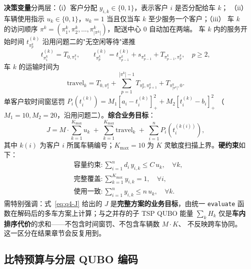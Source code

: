 \documentclass[UTF8,12pt,a4paper]{ctexart}
\begin{document}
\textbf{决策变量}分两层：（i）客户分配 $y_{i,k}\in\{0,1\}$，表示客户 $i$ 是否分配给车 $k$；
（ii）车辆使用指示 $u_k\in\{0,1\}$，$u_k=1$ 当且仅当车 $k$ 至少服务一个客户；（iii）
车 $k$ 的访问顺序 $\pi^k=(\pi_1^k,\pi_2^k,\dots,\pi_{|\pi^k|}^k)$，配送中心 $0$ 自动加在两端。
车 $k$ 内的服务开始时间 $t_{\pi_p^k}^{(k)}$ 沿用问题二的"无空闲等待"递推
\begin{equation}
\label{eq:q4-time}
t_{\pi_1^k}^{(k)}=T_{0,\pi_1^k},\qquad
t_{\pi_p^k}^{(k)}=t_{\pi_{p-1}^k}^{(k)}+s_{\pi_{p-1}^k}+T_{\pi_{p-1}^k,\pi_p^k},\quad p\ge 2,
\end{equation}
车 $k$ 的运输时间为
\begin{equation}
\label{eq:q4-travel}
\mathrm{travel}_k=T_{0,\pi_1^k}+\sum_{p=1}^{|\pi^k|-1}T_{\pi_p^k,\pi_{p+1}^k}+T_{\pi_{|\pi^k|}^k,0}.
\end{equation}
单客户软时间窗惩罚 $P_i(t_i^{(k)})=M_1[a_i-t_i^{(k)}]_+^2+M_2[t_i^{(k)}-b_i]_+^2$
（$M_1=10,M_2=20$，沿用问题二）。\textbf{综合业务目标}：
\begin{equation}
\label{eq:q4-J}
J=M\!\cdot\!\sum_{k=1}^{K_{\max}}u_k\;+\;\sum_{k=1}^{K_{\max}}\mathrm{travel}_k\;+\;\sum_{i=1}^{n}P_i(t_i^{(k(i))}),
\end{equation}
其中 $k(i)$ 为客户 $i$ 所属车辆编号；$K_{\max}=10$ 为 $K$ 灵敏度扫描上界。\textbf{硬约束}如下：
\begin{align}
\label{eq:q4-cap}
&\textbf{容量约束}: \sum_{i=1}^{n}d_i\,y_{i,k}\le C\,u_k,\quad \forall k,\\
\label{eq:q4-cover}
&\textbf{完整覆盖}: \sum_{k=1}^{K_{\max}}y_{i,k}=1,\quad \forall i,\\
\label{eq:q4-link}
&\textbf{使用一致}: \sum_{i=1}^{n}y_{i,k}\le n\,u_k,\quad \forall k.
\end{align}
需特别强调：式~\eqref{eq:q4-J} 给出的 $J$ 是\textbf{完整方案的业务目标}，由统一
\texttt{evaluate} 函数在解码后的多车方案上计算；与之并存的子 TSP QUBO 能量
$\sum_k H_k$ 仅是\textbf{车内排序代价}的求和——不包含时间窗罚、不包含车辆数 $M\!\cdot\!K$、
不反映跨车协同。这一区分在结果章节会反复用到。

\subsection{比特预算与分层 QUBO 编码}
\label{subsec:q4-budget}
\end{document}
